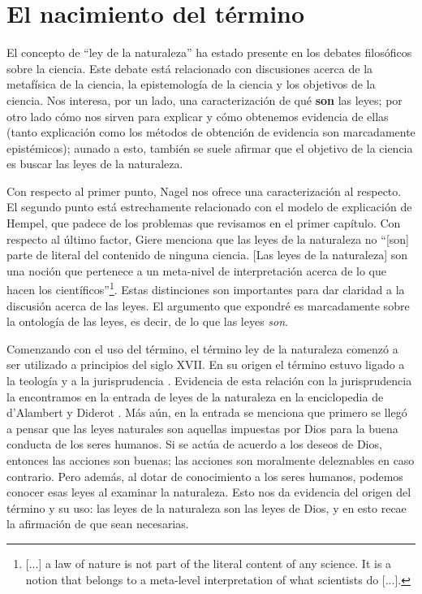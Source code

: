 \section{El nacimiento del término}

\noindent El concepto de ``ley de la naturaleza'' ha estado presente en los debates filosóficos sobre la ciencia. Este debate está relacionado con discusiones acerca de la metafísica de la ciencia, la epistemología de la ciencia y los objetivos de la ciencia. Nos interesa, por un lado, una caracterización de qué \textbf{son} las leyes; por otro lado cómo nos sirven para explicar y cómo obtenemos evidencia de ellas (tanto explicación como los métodos de obtención de evidencia son marcadamente epistémicos); aunado a esto, también se suele afirmar que el objetivo de la ciencia es buscar las leyes de la naturaleza.

Con respecto al primer punto, Nagel nos ofrece una caracterización al respecto. El segundo punto está estrechamente relacionado con el modelo de explicación de Hempel, que padece de los problemas que revisamos en el primer capítulo. Con respecto al último factor, Giere \citeyear[p. 69]{Giere2006} menciona que las leyes de la naturaleza no ``[son] parte de literal del contenido de ninguna ciencia. [Las leyes de la naturaleza] son una noción que pertenece a un meta-nivel de interpretación acerca de lo que hacen los científicos''\footnote{[...] a law of nature is not part of the literal content of any science. It is a notion that belongs to a meta-level interpretation of what scientists do [...].}. Estas distinciones son importantes para dar claridad a la discusión acerca de las leyes. El argumento que expondré es marcadamente sobre la ontología de las leyes, es decir, de lo que las leyes \textit{son}.

Comenzando con el uso del término, el término ley de la naturaleza comenzó a ser utilizado a principios del siglo XVII. En su origen el término estuvo ligado a la teología y a la jurisprudencia \cite{Giere2006, Giere1999}. Evidencia de esta relación con la jurisprudencia la encontramos en la entrada de leyes de la naturaleza en la enciclopedia de d'Alambert y Diderot \cite{lawna}. Más aún, en la entrada se menciona que primero se llegó a pensar que las leyes naturales son aquellas impuestas por Dios para la buena conducta de los seres humanos. Si se actúa de acuerdo a los deseos de Dios, entonces las acciones son buenas; las acciones son moralmente deleznables en caso contrario. Pero además, al dotar de conocimiento a los seres humanos, podemos conocer esas leyes al examinar la naturaleza. Esto nos da evidencia del origen del término y su uso: las leyes de  la naturaleza son las leyes de Dios, y en esto recae la afirmación de que sean necesarias.

